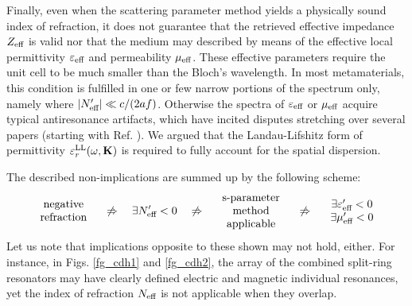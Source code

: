 Finally, even when the scattering parameter method yields a physically sound index of refraction, it does not guarantee that the retrieved effective impedance $Z_{\text{eff} }$ is valid nor that the medium may described by means of the effective local permittivity $\varepsilon_{\text{eff} }$ and permeability $\mu_{\text{eff} }$. These effective parameters require the unit cell to be much smaller than the Bloch's wavelength. In most metamaterials, this condition is fulfilled in one or few narrow portions of the spectrum only, namely where $|N_{\text{eff} }'| \ll c/(2af)$. Otherwise the spectra of $\varepsilon_{\text{eff} }$ or $\mu_{\text{eff} }$ acquire typical antiresonance artifacts, which have incited disputes stretching over several papers (starting with Ref. \cite{koschny2003resonant}). We argued that the Landau-Lifshitz form of permittivity $\varepsilon_r^\text{LL}(\omega,{\mathbf{K}})$ is required to fully account for the spatial dispersion. 

The described non-implications are summed up by the following scheme:
\begin{equation}
\begin{array}{c} \text{negative}\\ \text{refraction} \end{array}
\quad\not\Rightarrow\quad  \exists N_{\text{eff} }' < 0 
\quad\not\Rightarrow\quad \begin{array}{c} \text{s-parameter}\\ \text{method}\\ \text{applicable}  \end{array}
\quad\not\Rightarrow\quad \begin{array}{c} \exists \varepsilon_{\text{eff} }'<0\\ \exists\mu_{\text{eff} }'<0  \end{array} 
\label{eq_implications}\end{equation} %
Let us note that implications opposite to these shown may not hold, either.  For instance, in Figs. \ref{fg_cdh1} and \ref{fg_cdh2}, the array of the combined split-ring resonators may have clearly defined electric and magnetic individual resonances, yet the index of refraction $N_{\text{eff} }$ is not applicable when they overlap.


